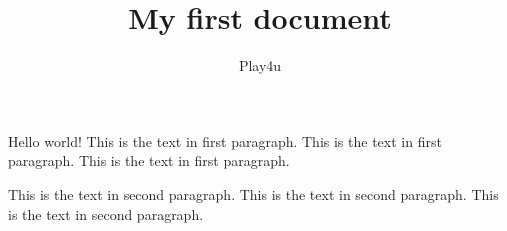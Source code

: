 \documentclass{article}
\title{My first document}
\author{Play4u}
\begin{document}
	\maketitle
	\newpage
	Hello world!
	This is the text in first paragraph. This is the 
	text in first 
paragraph. This is the text in first paragraph. \par
This is the text in second paragraph. This is the text in second 
paragraph. This is the text in second paragraph.
\end{document}
